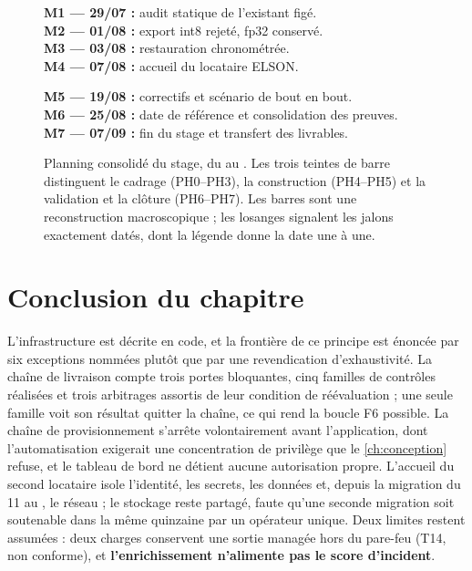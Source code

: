 \begin{figure}[p]
\vspace{4pt}
\begin{minipage}[t]{0.48\textwidth}\scriptsize
\textbf{M1 --- 29/07 :} audit statique de l'existant figé.\\
\textbf{M2 --- 01/08 :} export int8 rejeté, fp32 conservé.\\
\textbf{M3 --- 03/08 :} restauration chronométrée.\\
\textbf{M4 --- 07/08 :} accueil du locataire ELSON.
\end{minipage}\hfill
\begin{minipage}[t]{0.48\textwidth}\scriptsize
\textbf{M5 --- 19/08 :} correctifs et scénario de bout en bout.\\
\textbf{M6 --- 25/08 :} date de référence et consolidation des preuves.\\
\textbf{M7 --- 07/09 :} fin du stage et transfert des livrables.
\end{minipage}
\caption[Planning consolidé du stage, du \datedebutstage{} au \datefinstage{}]{Planning consolidé
du stage, du \datedebutstage{} au \datefinstage{}. Les trois teintes de barre distinguent le
cadrage (PH0--PH3), la construction (PH4--PH5) et la validation et la clôture (PH6--PH7). Les
barres sont une reconstruction macroscopique ; les losanges signalent les jalons exactement datés,
dont la légende donne la date une à une.}
\label{fig:gantt}
\end{figure}


\section*{Conclusion du chapitre}

L'infrastructure est décrite en code, et la frontière de ce principe est énoncée par six exceptions
nommées plutôt que par une revendication d'exhaustivité. La chaîne de livraison compte trois portes
bloquantes, cinq familles de contrôles réalisées et trois arbitrages assortis de leur condition de
réévaluation ; une seule famille voit son résultat quitter la chaîne, ce qui rend la boucle F6
possible. La chaîne de provisionnement s'arrête volontairement avant l'application, dont
l'automatisation exigerait une concentration de privilège que le \cref{ch:conception} refuse, et le tableau de
bord ne détient aucune autorisation propre. L'accueil du second locataire isole l'identité, les
secrets, les données et, depuis la migration du 11 au \dateref, le réseau ; le stockage reste
partagé, faute qu'une seconde migration soit soutenable dans la même quinzaine par un opérateur
unique. Deux limites restent assumées : deux charges conservent une sortie managée hors du pare-feu
(T14, non conforme), et \textbf{l'enrichissement n'alimente pas le score d'incident}.
